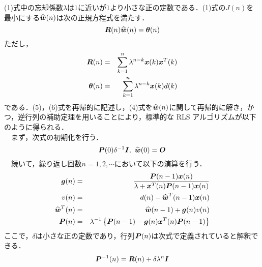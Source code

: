 \documentclass[a4paper,11pt]{jarticle}
\begin{document}
(1)式中の忘却係数$ \lambda $は$ 1 $に近いが$ 1 $より小さな正の定数である．(1)式の$ J(n) $を最小にする$ \widehat{\mbox{\boldmath$w$}}(n) $は次の正規方程式を満たす．
\begin{equation}
 \mbox{\boldmath$R$}(n)\widehat{\mbox{\boldmath$w$}}(n) = \mbox{\boldmath$\theta$}(n)
\end{equation}
ただし，
\begin{eqnarray}
 \mbox{\boldmath$R$}(n) & = & \sum^n_{k=1} \lambda^{n-k} \mbox{\boldmath$x$}(k) \mbox{\boldmath$x$}^T(k) \\
 \mbox{\boldmath$\theta$}(n) & = & \sum^n_{k=1} \lambda^{n-k} \mbox{\boldmath$x$}(k) d(k)
\end{eqnarray}
である．(5)，(6)式を再帰的に記述し，(4)式を$ \widehat{\mbox{\boldmath$w$}}(n) $に関して再帰的に解き，かつ，逆行列の補助定理を用いることにより，標準的な RLS アルゴリズムが以下のように得られる{\cite{LMS}}．\\
\ \ まず，次式の初期化を行う．
\begin{equation}
 \mbox{\boldmath$P$}(0) \delta^{-1} \mbox{\boldmath$I$}, ~ \widehat{\mbox{\boldmath$w$}}(0) = \mbox{\boldmath$O$}
\end{equation}
\ \ 続いて，繰り返し回数$ n = 1,2, \cdots $において以下の演算を行う．
\begin{eqnarray}
 \mbox{\boldmath$g$}(n) & = & \dfrac{\mbox{\boldmath$P$}(n-1)\mbox{\boldmath$x$}(n)}{\lambda + \mbox{\boldmath$x$}^T(n)\mbox{\boldmath$P$}(n-1)\mbox{\boldmath$x$}(n)} \\
 v(n) & = & d(n) - \widehat{\mbox{\boldmath$w$}}^T(n-1) \mbox{\boldmath$x$}(n) \\
 \widehat{\mbox{\boldmath$w$}}^T(n) & = & \widehat{\mbox{\boldmath$w$}}(n-1) + \mbox{\boldmath$g$}(n) v(n) \\
 \mbox{\boldmath$P$}(n) & = & \lambda^{-1} \left\{ \mbox{\boldmath$P$}(n-1) - \mbox{\boldmath$g$}(n) \mbox{\boldmath$x$}^T(n) \mbox{\boldmath$P$}(n-1) \right\}
\end{eqnarray}
ここで，$ \delta $は小さな正の定数であり，行列$ \mbox{\boldmath$P$}(n) $は次式で定義されていると解釈できる．
\begin{equation}
 \mbox{\boldmath$P$}^{-1}(n) = \mbox{\boldmath$R$}(n) + \delta \lambda^n \mbox{\boldmath$I$}
\end{equation}
\end{document}
